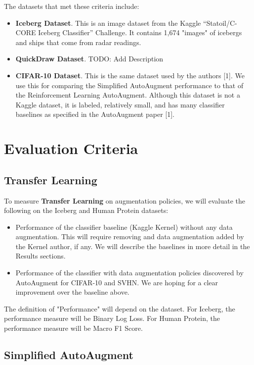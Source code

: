 \documentclass[10pt,twocolumn,letterpaper]{article}
\begin{document}
The datasets that met these criteria include:

\begin{itemize}
  \item \textbf{Iceberg Dataset}.  This is an image dataset from the Kaggle “Statoil/C-CORE Iceberg Classifier” Challenge.  It contains 1,674 "images" of icebergs and ships that come from radar readings.  
  \item \textbf{QuickDraw Dataset}.  TODO: Add Description
  \item \textbf{CIFAR-10 Dataset}.  This is the same dataset used by the authors [1].  We use this for comparing the Simplified AutoAugment performance to that of the Reinforcement Learning AutoAugment.  Although this dataset is not a Kaggle dataset, it is labeled, relatively small, and has many classifier baselines as specified in the AutoAugment paper [1].        
\end{itemize}


\section{Evaluation Criteria}

\subsection{Transfer Learning}

To measure \textbf{Transfer Learning} on augmentation policies, we will evaluate the following on the Iceberg and Human Protein datasets:

\begin{itemize}
  \item Performance of the classifier baseline (Kaggle Kernel) without any data augmentation.  This will require removing and data augmentation added by the Kernel author, if any.  We will describe the baselines in more detail in the Results sections.
  \item Performance of the classifier with data augmentation policies discovered by AutoAugment for CIFAR-10 and SVHN.  We are hoping for a clear improvement over the baseline above.
\end{itemize}

The definition of "Performance" will depend on the dataset.  For Iceberg, the performance measure will be Binary Log Loss.  For Human Protein, the performance measure will be Macro F1 Score.

\subsection{Simplified AutoAugment}
\end{document}

